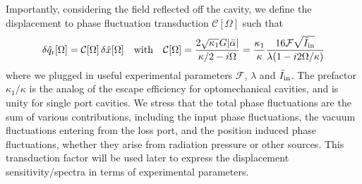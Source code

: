 Importantly, considering the field reflected off the cavity, we define the displacement to phase fluctuation transduction $\mathcal{C}[\Omega]$ such that 
\begin{equation}
  \delta \hat{q}_{\mathrm{r}}[\Omega] = \mathcal{C}[\Omega] \, \delta \hat{x}[\Omega] \quad \text{with} \quad \mathcal{C}[\Omega] = \frac{2\sqrt{\kappa_1}G|\bar \alpha|}{\kappa/2 - i\Omega} = \frac{\kappa_1}{\kappa} \dfrac{16 \mathcal{F}\sqrt{\bar{I}_{\rm in}}}{\lambda (1- i2\Omega/\kappa)}
\end{equation}
where we plugged in useful experimental parameters $\mathcal{F}$, $\lambda$ and $\bar I_{\rm in}$. The prefactor $\kappa_1/\kappa$ is the analog of the escape efficiency for optomechanical cavities, and is unity for single port cavities. We stress that the total phase fluctuations are the sum of various contributions, including the input phase fluctuations, the vacuum fluctuations entering from the loss port, and the position induced phase fluctuations, whether they arise from radiation pressure or other sources. This transduction factor will be used later to express the displacement sensitivity/spectra in terms of experimental parameters. \\



